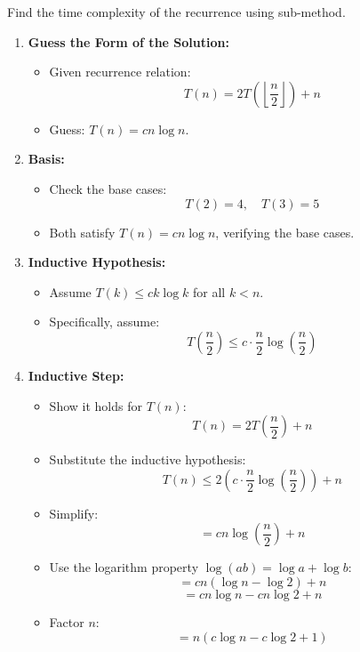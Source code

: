     \begin{example}
        Find the time complexity of the recurrence using sub-method. 
        \begin{enumerate}
            \item \textbf{Guess the Form of the Solution:}
            \begin{itemize}
                \item Given recurrence relation:
                \[
                T(n) = 2T\left(\left\lfloor \frac{n}{2} \right\rfloor\right) + n
                \]
                \item Guess: \( T(n) = cn \log n \).
            \end{itemize}
        
            \item \textbf{Basis:}
            \begin{itemize}
                \item Check the base cases:
                \[
                T(2) = 4, \quad T(3) = 5
                \]
                \item Both satisfy \( T(n) = cn \log n \), verifying the base cases.
            \end{itemize}
            
            \item \textbf{Inductive Hypothesis:}
            \begin{itemize}
                \item Assume \( T(k) \leq ck \log k \) for all \( k < n \).
                \item Specifically, assume:
                \[
                T\left(\frac{n}{2}\right) \leq c \cdot \frac{n}{2} \log\left(\frac{n}{2}\right)
                \]
            \end{itemize}
        
            \item \textbf{Inductive Step:}
            \begin{itemize}
                \item Show it holds for \( T(n) \):
                \[
                T(n) = 2T\left(\frac{n}{2}\right) + n
                \]
                \item Substitute the inductive hypothesis:
                \[
                T(n) \leq 2 \left(c \cdot \frac{n}{2} \log\left(\frac{n}{2}\right)\right) + n
                \]
                \item Simplify:
                \[
                = cn \log\left(\frac{n}{2}\right) + n
                \]
                \item Use the logarithm property \( \log(ab) = \log a + \log b \):
                \[
                = cn(\log n - \log 2) + n
                \]
                \[
                = cn \log n - cn \log 2 + n
                \]
                \item Factor \( n \):
                \[
                = n(c \log n - c \log 2 + 1)
                \]
            \end{itemize}
        

\end{enumerate}
\end{example}
